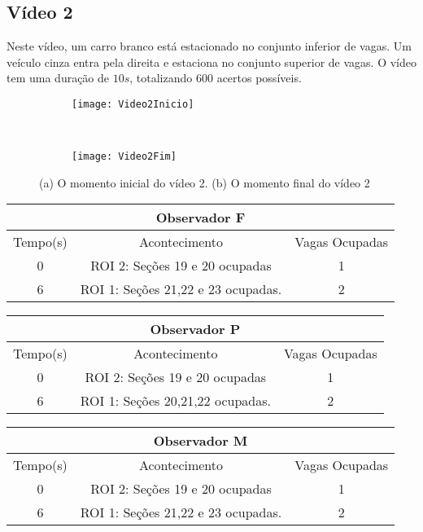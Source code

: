 \subsection{Vídeo 2}

Neste vídeo, um carro branco está estacionado no conjunto inferior de vagas. Um veículo cinza entra pela direita e estaciona no conjunto superior de vagas. O vídeo tem uma duração de $10s$, totalizando $600$ acertos possíveis.

\begin{figure}[!h]
\centering
\begin{subfigure}{.5\textwidth}
\centering
\texttt{[image: Video2Inicio]}
\caption{}
\end{subfigure}\
\begin{subfigure}{.5\textwidth}
\centering
\texttt{[image: Video2Fim]}
\caption{}
\end{subfigure}
\centering
\caption{(a) O momento inicial do vídeo 2. (b) O momento final do vídeo 2}%
\label{}%
\end{figure}


\begin{center}
\begin{tabular}{|c||c||c|}
\hline
\multicolumn{3}{|c|}{Observador F}  \\ \hline \hline
Tempo(s) & Acontecimento & Vagas Ocupadas\\ \hline
0 & ROI 2: Seções 19 e 20 ocupadas & 1 \\ \hline
6 & ROI 1: Seções 21,22 e 23 ocupadas. & 2 \\
\hline
\end{tabular}
\end{center}

\begin{center}
\begin{tabular}{|c||c||c|}
\hline
\multicolumn{3}{|c|}{Observador P}  \\ \hline \hline
Tempo(s) & Acontecimento & Vagas Ocupadas\\ \hline
0 & ROI 2: Seções 19 e 20 ocupadas  & 1\\ \hline
6 & ROI 1: Seções 20,21,22 ocupadas. & 2 \\
\hline
\end{tabular}
\end{center}

\begin{center}
\begin{tabular}{|c||c||c|}
\hline
\multicolumn{3}{|c|}{Observador M}  \\ \hline \hline
Tempo(s) & Acontecimento & Vagas Ocupadas\\ \hline
0 & ROI 2: Seções 19 e 20 ocupadas & 1\\ \hline
6 & ROI 1: Seções 21,22 e 23 ocupadas. & 2\\
\hline
\end{tabular}
\end{center}


